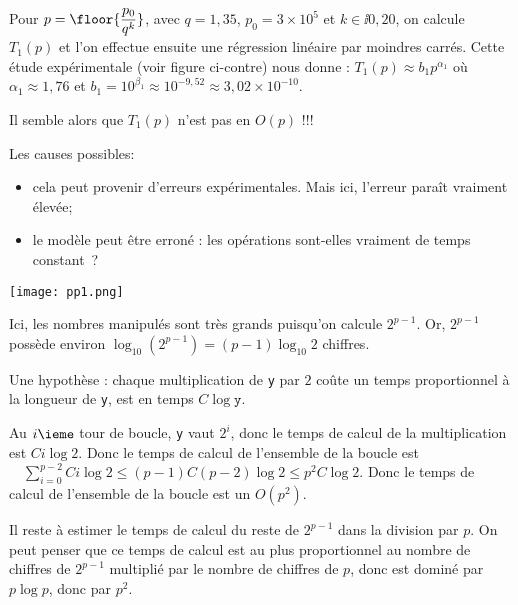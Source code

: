 \begin{minipage}[c]{.48\linewidth}
Pour $p = \floor{\dfrac{p_0}{q^k}}$, avec $q = 1,35$, $p_0 = 3\times 10^5$ et $k\in\ii{0,20}$, on calcule $T_1(p)$ et l'on effectue ensuite une régression linéaire par moindres carrés. Cette étude expérimentale 
(voir figure ci-contre)
nous donne :
$  T_{1}(p)\approx b_{1} p^{\alpha_{1}}$ où $\alpha_{1}\approx 1,76$
et  $b_{1} = 10^{\beta_{1}} \approx 10^{-9,52}  \approx 3,02 \times 10^{-10}$.

Il semble alors que $T_1(p)$ n'est pas en $O(p)$ !!!

Les causes possibles:
\begin{itemize}
\item[\textbullet] cela peut provenir d'erreurs expérimentales. Mais ici, l'erreur paraît vraiment 
élevée;
\item[\textbullet] le modèle peut être erroné : les opérations sont-elles vraiment de temps constant~?
\end{itemize}
\end{minipage} \hfill
\begin{minipage}[c]{.48\linewidth}
  \begin{center}
    \texttt{[image: pp1.png]}
  \end{center}
\end{minipage} 




Ici, les nombres manipulés sont très grands puisqu'on calcule
$2^{p-1}$. Or, $2^{p-1}$ possède environ $\log_{10} (2^{p-1}) =
(p-1)\log_{10} 2$ chiffres.

Une hypothèse : chaque multiplication de \texttt{y} par $2$ coûte un temps proportionnel à la longueur de \texttt{y}, est en temps $C \log \texttt{y}$.

Au $i\ieme$ tour de boucle, \texttt{y} vaut $2^{i}$, donc le temps de
calcul de la multiplication est $C i \log 2$. Donc le temps de calcul
de l'ensemble de la boucle est $\quad   \sum_{i=0}^{p-2} C i \log 2 \leq (p-1) C (p-2)\log 2\leq p^{2}C\log 2$.
Donc le temps de calcul de l'ensemble de la boucle est un $O(p^{2})$.

Il reste à estimer le temps de calcul du reste de $2^{p-1}$ dans la
division par $p$. On peut penser que ce temps de calcul est au plus
proportionnel au nombre de chiffres de $2^{p-1}$ multiplié par le
nombre de chiffres de $p$, donc est dominé par $p\log p$, donc par
$p^{2}$.

